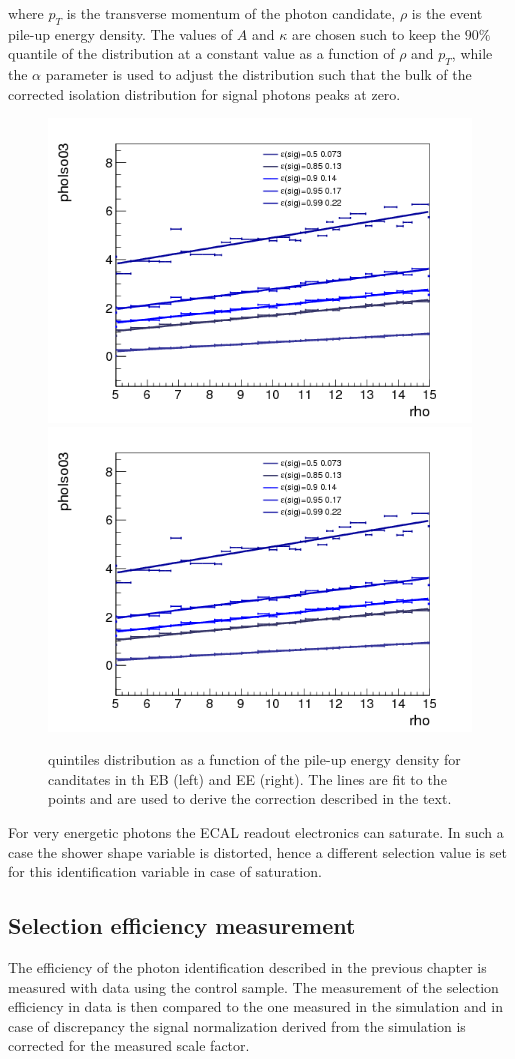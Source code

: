 where $p_T$ is the transverse momentum of the photon candidate, $\rho$ is the event pile-up energy density.
The values of $A$ and $\kappa$ are chosen such to keep the $90\%$ quantile of the distribution at a constant
value as a function of $\rho$ and $p_T$, while the $\alpha$ parameter is used to adjust the distribution such
that the bulk of the corrected isolation distribution for signal photons peaks at zero.

\begin{figure}[!h]
  \centering
  \includegraphics[width = .45\textwidth]{figures/diphotons/qtiles_phoIso03_outerEB.png}
  \includegraphics[width = .45\textwidth]{figures/diphotons/qtiles_phoIso03_outerEB.png}
  \caption{\phoIso quintiles distribution as a function of the pile-up energy density for canditates in th EB  (left) and
    EE (right). The lines are fit to the points and are used to derive the correction described in the text.}
  \label{fig:phoiso_qtiles}
\end{figure}

For very energetic photons the ECAL readout electronics can saturate. In such a case the shower shape variable
\sieie is distorted, hence a different selection value is set for this identification variable in case of saturation.

\subsection{Selection efficiency measurement}
\label{sec:dipho_eff}
The efficiency of the photon identification described in the previous chapter is measured with data
using the \Zee control sample. The measurement of the selection efficiency in data is then
compared to the one measured in the simulation and in case of discrepancy the signal normalization
derived from the simulation is corrected for the measured scale factor.

